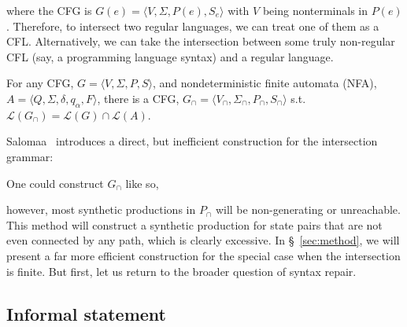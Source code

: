 \documentclass[sigplan,review,acmsmall,nonacm,screen,anonymous]{acmart}\settopmatter{printfolios=false,printccs=false,printacmref=false}
\begin{document}
\noindent where the CFG is $G(e) = \langle V, \Sigma, P(e), S_e\rangle$ with $V$ being nonterminals in $P(e)$. Therefore, to intersect two regular languages, we can treat one of them as a CFL. Alternatively, we can take the intersection between some truly non-regular CFL (say, a programming language syntax) and a regular language.

\begin{theorem}
  For any CFG, $G = \langle V, \Sigma, P, S\rangle$, and nondeterministic finite automata (NFA), $A = \langle Q, \Sigma, \delta, q_\alpha, F\rangle$, there is a CFG, \(G_\cap=\langle V_\cap, \Sigma_\cap, P_\cap, S_\cap\rangle\) s.t. $\mathcal{L}(G_\cap) = \mathcal{L}(G)\cap\mathcal{L}(A)$.
\end{theorem}

\noindent Salomaa~\cite{salomaa1973formal} introduces a direct, but inefficient construction for the intersection grammar:

\begin{definition}[Salomaa, 1973]
  One could construct $G_\cap$ like so,

  \noindent{}
\end{definition}\vspace{0.2cm}

\noindent however, most synthetic productions in $P_\cap$ will be non-generating or unreachable. This method will construct a synthetic production for state pairs that are not even connected by any path, which is clearly excessive. In \S~\ref{sec:method}, we will present a far more efficient construction for the special case when the intersection is finite. But first, let us return to the broader question of syntax repair.

\subsection{Informal statement}
\end{document}
